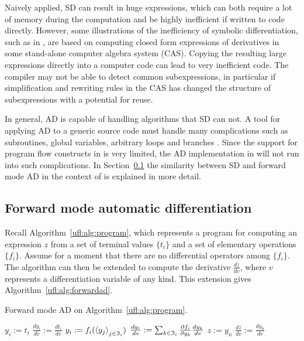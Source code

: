Naively applied, SD can result in huge expressions, which can both require
a lot of memory during the computation and be highly inefficient if
written to code directly. However, some illustrations of the inefficiency
of symbolic differentiation, such as in \citet{Griewank1989}, are based
on computing closed form expressions of derivatives in some stand-alone
computer algebra system (CAS).  Copying the resulting large expressions
directly into a computer code can lead to very inefficient code. The
compiler may not be able to detect common subexpressions, in particular
if simplification and rewriting rules in the CAS has changed the structure
of subexpressions with a potential for reuse.

In general, AD is capable of handling algorithms that SD can not.  A tool
for applying AD to a generic source code must handle many complications
such as subroutines, global variables, arbitrary loops and branches
\citep{BischofCarleCorlissEtAl1992,BischofHovlandNorris2002,GieringKaminski1998}.
Since the support for program flow constructs in \ufl{} is very limited,
the AD implementation in \ufl{} will not run into such complications.
In Section~\ref{ufl:sec:forwardad} the similarity between SD and forward
mode AD in the context of \ufl{} is explained in more detail.

\vspace*{-1.2pt}
\subsection{Forward mode automatic differentiation}
\label{ufl:sec:forwardad}

Recall Algorithm~\ref{ufl:alg:program}, which represents a program for
computing an expression $z$ from a set of terminal values $\{ t_i \}$
and a set of elementary operations $\{ f_i \}$. Assume for a moment that
there are no differential operators among $\{ f_i \}$.  The algorithm
can then be extended to compute the derivative $\frac{d z}{d
  v}$, where $v$ represents a differentiation variable of any kind.
This extension gives Algorithm~\ref{ufl:alg:forwardad}.

\begin{algorithm}[!t]
\caption{Forward mode AD on Algorithm~\ref{ufl:alg:program}.}
\label{ufl:alg:forwardad}
\begin{algorithmic}[1]
\State $y_i := t_i$
\State $\frac{d y_i}{d v} := \frac{d t_i}{d v}$
\EndFor
{}
\State $y_i := f_i(\left\langle{y_j}\right\rangle_{j\in\mathfrak{I}_i})$
\State $\frac{d y_i}{d v} := \sum_{k\in\mathfrak{I}_i} \frac{\partial f_i}{\partial y_k} \frac{d y_k}{d v}$
\EndFor
\State $z := y_n$
\State $\frac{d z}{d v} := \frac{d y_n}{d v}$
\end{algorithmic}
\end{algorithm}

